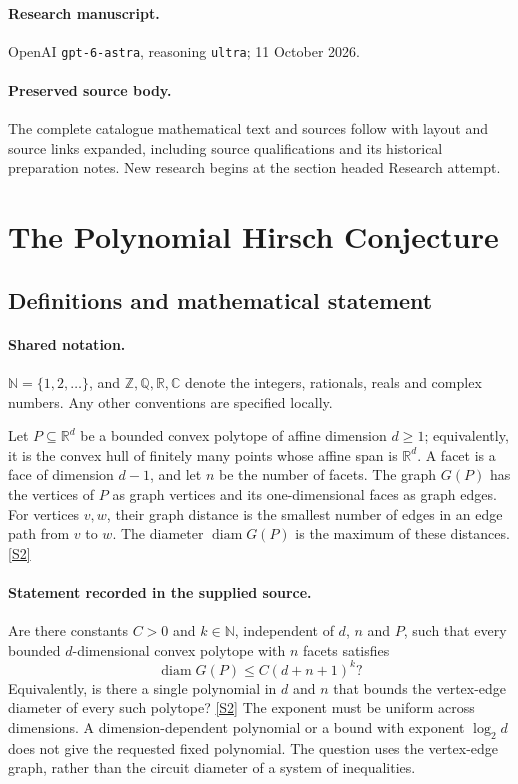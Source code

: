 \documentclass[11pt]{article}
\begin{document}
\paragraph{Research manuscript.} OpenAI \texttt{gpt-6-astra}, reasoning \texttt{ultra}; 11 October 2026.
\paragraph{Preserved source body.} The complete catalogue mathematical text and sources follow with layout and source links expanded, including source qualifications and its historical preparation notes. New research begins at the section headed Research attempt.

\section{The Polynomial Hirsch Conjecture}\label{statement}

\subsection{Definitions and mathematical statement}

\paragraph{Shared notation.}$\mathbb N=\{1,2,\ldots\}$, and $\mathbb Z,\mathbb Q,\mathbb R,\mathbb C$ denote the integers, rationals, reals and complex numbers. Any other conventions are specified locally.


Let $P\subseteq\mathbb R^d$ be a bounded convex polytope of affine dimension $d\ge1$; equivalently, it is the convex hull of finitely many points whose affine span is $\mathbb R^d$. A facet is a face of dimension $d-1$, and let $n$ be the number of facets. The graph $G(P)$ has the vertices of $P$ as graph vertices and its one-dimensional faces as graph edges. For vertices $v,w$, their graph distance is the smallest number of edges in an edge path from $v$ to $w$. The diameter $\operatorname{diam}G(P)$ is the maximum of these distances. \href{https://arxiv.org/pdf/1006.2814}{[S2]}
\paragraph{Statement recorded in the supplied source.}
Are there constants $C>0$ and $k\in\mathbb N$, independent of $d$, $n$ and $P$, such that every bounded $d$-dimensional convex polytope with $n$ facets satisfies
\[
 \operatorname{diam}G(P)\le C(d+n+1)^k?
\]
Equivalently, is there a single polynomial in $d$ and $n$ that bounds the vertex-edge diameter of every such polytope? \href{https://arxiv.org/pdf/1006.2814}{[S2]}
The exponent must be uniform across dimensions. A dimension-dependent polynomial or a bound with exponent $\log_2 d$ does not give the requested fixed polynomial. The question uses the vertex-edge graph, rather than the circuit diameter of a system of inequalities.
\end{document}
